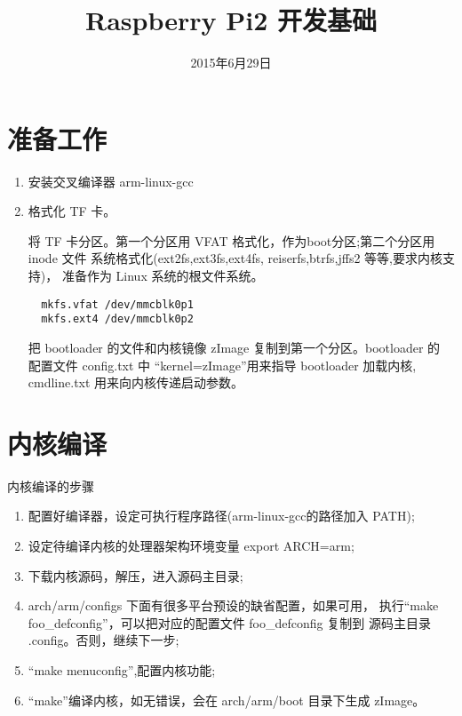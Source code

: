 \documentclass[nofonts]{ctexart}
\title{Raspberry Pi2 开发基础}
\date{2015年6月29日}
\begin{document}
\lstset{language=C++}
\lstset{extendedchars=false}
\lstset{numbers=none}

\maketitle

\tableofcontents

\newpage
\section{准备工作}
\begin{enumerate}
  \item 安装交叉编译器 arm-linux-gcc
  \item 格式化 TF 卡。

  将 TF 卡分区。第一个分区用 VFAT 格式化，作为boot分区;第二个分区用 inode 文件
系统格式化(ext2fs,ext3fs,ext4fs, reiserfs,btrfs,jffs2 等等,要求内核支持)，
准备作为 Linux 系统的根文件系统。

\begin{verbatim}
  mkfs.vfat /dev/mmcblk0p1
  mkfs.ext4 /dev/mmcblk0p2
\end{verbatim}

把 bootloader 的文件和内核镜像 zImage 复制到第一个分区。bootloader 的
配置文件 config.txt 中 ``kernel=zImage''用来指导 bootloader 加载内核,
cmdline.txt 用来向内核传递启动参数。
\end{enumerate}

\section{内核编译}
内核编译的步骤
\begin{enumerate}
  \item 配置好编译器，设定可执行程序路径(arm-linux-gcc的路径加入 PATH);
  \item 设定待编译内核的处理器架构环境变量 export ARCH=arm;
  \item 下载内核源码，解压，进入源码主目录;
  \item arch/arm/configs 下面有很多平台预设的缺省配置，如果可用，
  执行``make foo\_defconfig''，可以把对应的配置文件 foo\_defconfig 复制到
  源码主目录 .config。否则，继续下一步;
  \item ``make menuconfig'',配置内核功能;
  \item ``make''编译内核，如无错误，会在 arch/arm/boot 目录下生成 zImage。
\end{enumerate}
\end{document}
